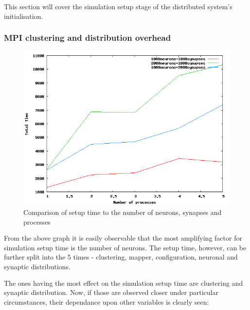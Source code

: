 This section will cover the simulation setup stage of the distributed system's initialisation.

\subsubsection{MPI clustering and distribution overhead}

\begin{figure}[h]
\begin{center}
\includegraphics[scale = 0.5]{images/evaluation/setup_comparison.png}
\end{center}
\caption{Comparison of setup time to the number of neurons, synapses and processes}
\end{figure}

From the above graph it is easily observable that the most amplifying factor for simulation setup time is the number of neurons. The setup time, however, can be further split into the 5 times - clustering, mapper, configuration, neuronal and synaptic distributions.

The ones having the most effect on the simulation setup time are clustering and synaptic distribution. Now, if those are observed closer under particular circumstances, their dependance upon other variables is clearly seen:

